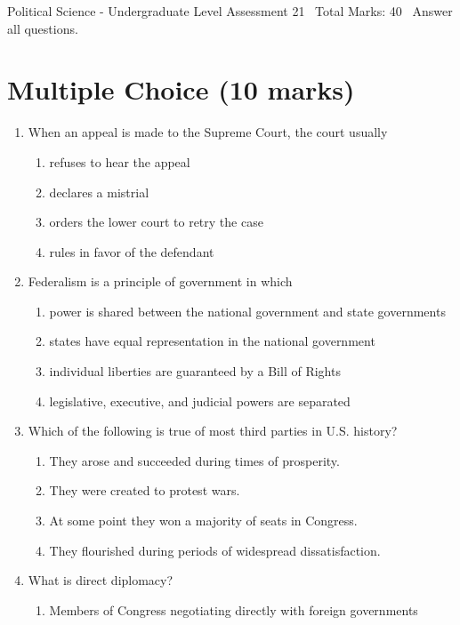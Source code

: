 \documentclass[12pt]{article}
\begin{document}
\begin{center}
Political Science - Undergraduate Level Assessment 21 \
Total Marks: 40 \
Answer all questions.
\end{center}

\section*{Multiple Choice (10 marks)}
\begin{enumerate}[label=\arabic*.]
\item When an appeal is made to the Supreme Court, the court usually
\begin{enumerate}[label=(\alph*)]
    \item refuses to hear the appeal
    \item declares a mistrial
    \item orders the lower court to retry the case
    \item rules in favor of the defendant
\end{enumerate}
\item Federalism is a principle of government in which
\begin{enumerate}[label=(\alph*)]
    \item power is shared between the national government and state governments
    \item states have equal representation in the national government
    \item individual liberties are guaranteed by a Bill of Rights
    \item legislative, executive, and judicial powers are separated
\end{enumerate}
\item Which of the following is true of most third parties in U.S. history?
\begin{enumerate}[label=(\alph*)]
    \item They arose and succeeded during times of prosperity.
    \item They were created to protest wars.
    \item At some point they won a majority of seats in Congress.
    \item They flourished during periods of widespread dissatisfaction.
\end{enumerate}
\item What is direct diplomacy?
\begin{enumerate}[label=(\alph*)]
    \item Members of Congress negotiating directly with foreign governments

\end{enumerate}
\end{enumerate}
\end{document}
